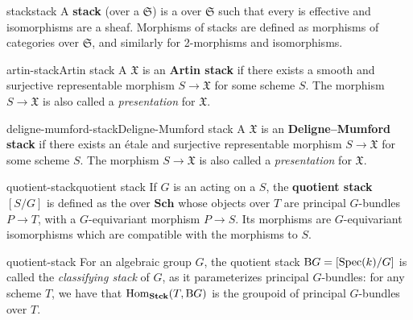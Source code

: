 \begin{topic}{stack}{stack}
    A \textbf{stack} (over a  $\mathfrak{S}$) is a  over $\mathfrak{S}$ such that every  is effective and isomorphisms are a sheaf. Morphisms of stacks are defined as morphisms of categories over $\mathfrak{S}$, and similarly for 2-morphisms and isomorphisms.
\end{topic}

\begin{topic}{artin-stack}{Artin stack}
    A  $\mathfrak{X}$ is an \textbf{Artin stack} if there exists a smooth and surjective representable morphism $S \to \mathfrak{X}$ for some scheme $S$. The morphism $S \to \mathfrak{X}$ is also called a \textit{presentation} for $\mathfrak{X}$.
\end{topic}

\begin{topic}{deligne-mumford-stack}{Deligne-Mumford stack}
    A  $\mathfrak{X}$ is an \textbf{Deligne--Mumford stack} if there exists an étale and surjective representable morphism $S \to \mathfrak{X}$ for some scheme $S$. The morphism $S \to \mathfrak{X}$ is also called a \textit{presentation} for $\mathfrak{X}$.
\end{topic}

\begin{topic}{quotient-stack}{quotient stack}
    If $G$ is an  acting on a  $S$, the \textbf{quotient stack} $[S/G]$ is defined as the  over $\textbf{Sch}$ whose objects over $T$ are principal $G$-bundles $P \to T$, with a $G$-equivariant morphism $P \to S$. Its morphisms are $G$-equivariant isomorphisms which are compatible with the morphisms to $S$.
\end{topic}

\begin{example}{quotient-stack}
    For an algebraic group $G$, the quotient stack $\textup{B}G = [\operatorname{Spec}(k) / G]$ is called the \textit{classifying stack} of $G$, as it parameterizes principal $G$-bundles: for any scheme $T$, we have that $\text{Hom}_{\textbf{Stck}}(T, \textup{B}G)$ is the groupoid of principal $G$-bundles over $T$.
\end{example}


